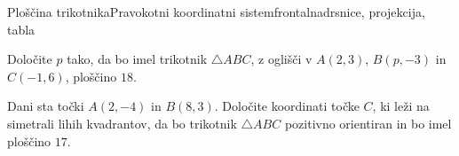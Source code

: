 \begin{priprava}{5}{}{Ploščina trikotnika}{Pravokotni koordinatni sistem}{frontalna}{drsnice, projekcija, tabla}
        \begin{naloga}
            Določite $p$ tako, da bo imel trikotnik $\triangle ABC$, z oglišči v $A(2,3)$, $B(p,-3)$ in $C(-1,6)$, ploščino $18$. 
        \end{naloga}

        \begin{naloga}
            Dani sta točki $A(2,-4)$ in $B(8,3)$. Določite koordinati točke $C$, ki leži na simetrali lihih kvadrantov, 
            da bo trikotnik $\triangle ABC$ pozitivno orientiran in bo imel ploščino $17$.
        \end{naloga}




\end{priprava}